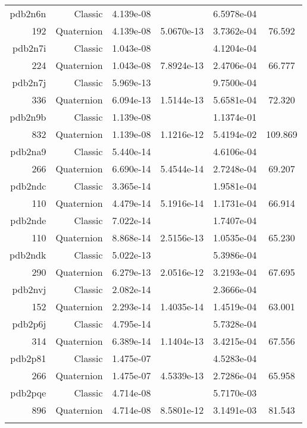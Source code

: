 \begin{xltabular}{\textwidth}{r|rS[table-format=1.3e+2]S[table-format=1.4e+2]S[table-format=1.4e+2]S[table-format=-1.3]}
pdb2n6n & Classic & 4.139e-08 &  & 6.5978e-04 & \\
192 & Quaternion & 4.139e-08 & 5.0670e-13 & 3.7362e-04 & 76.592\\  \addlinespace
pdb2n7i & Classic & 1.043e-08 &  & 4.1204e-04 & \\
224 & Quaternion & 1.043e-08 & 7.8924e-13 & 2.4706e-04 & 66.777\\  \addlinespace
pdb2n7j & Classic & 5.969e-13 &  & 9.7500e-04 & \\
336 & Quaternion & 6.094e-13 & 1.5144e-13 & 5.6581e-04 & 72.320\\  \addlinespace
pdb2n9b & Classic & 1.139e-08 &  & 1.1374e-01 & \\
832 & Quaternion & 1.139e-08 & 1.1216e-12 & 5.4194e-02 & 109.869\\  \addlinespace
pdb2na9 & Classic & 5.440e-14 &  & 4.6106e-04 & \\
266 & Quaternion & 6.690e-14 & 5.4544e-14 & 2.7248e-04 & 69.207\\  \addlinespace
pdb2ndc & Classic & 3.365e-14 &  & 1.9581e-04 & \\
110 & Quaternion & 4.479e-14 & 5.1916e-14 & 1.1731e-04 & 66.914\\  \addlinespace
pdb2nde & Classic & 7.022e-14 &  & 1.7407e-04 & \\
110 & Quaternion & 8.868e-14 & 2.5156e-13 & 1.0535e-04 & 65.230\\  \addlinespace
pdb2ndk & Classic & 5.022e-13 &  & 5.3986e-04 & \\
290 & Quaternion & 6.279e-13 & 2.0516e-12 & 3.2193e-04 & 67.695\\  \addlinespace
pdb2nvj & Classic & 2.082e-14 &  & 2.3666e-04 & \\
152 & Quaternion & 2.293e-14 & 1.4035e-14 & 1.4519e-04 & 63.001\\  \addlinespace
pdb2p6j & Classic & 4.795e-14 &  & 5.7328e-04 & \\
314 & Quaternion & 6.389e-14 & 1.1404e-13 & 3.4215e-04 & 67.556\\  \addlinespace
pdb2p81 & Classic & 1.475e-07 &  & 4.5283e-04 & \\
266 & Quaternion & 1.475e-07 & 4.5339e-13 & 2.7286e-04 & 65.958\\  \addlinespace
pdb2pqe & Classic & 4.714e-08 &  & 5.7170e-03 & \\
896 & Quaternion & 4.714e-08 & 8.5801e-12 & 3.1491e-03 & 81.543\\  \addlinespace

\end{xltabular}
